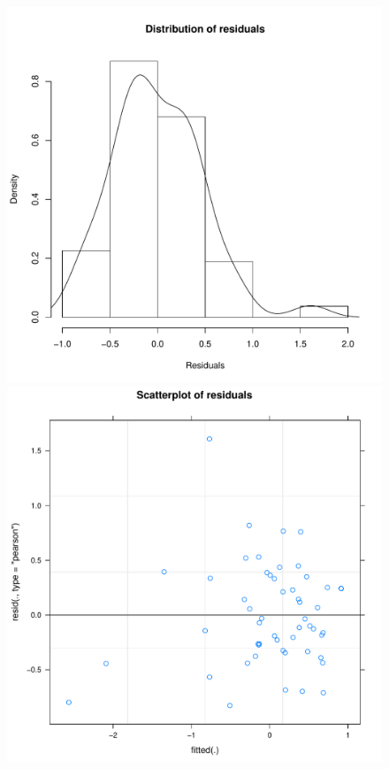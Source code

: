 \begin{CJK}{UTF8}{gbsn}


\begin{figure}[htbp]
    \includegraphics[scale =.4]{images/TEM2TeamHist.pdf}
    \includegraphics[scale =.4]{images/TEM2TeamScatter.pdf}

\end{figure}
\end{CJK}
